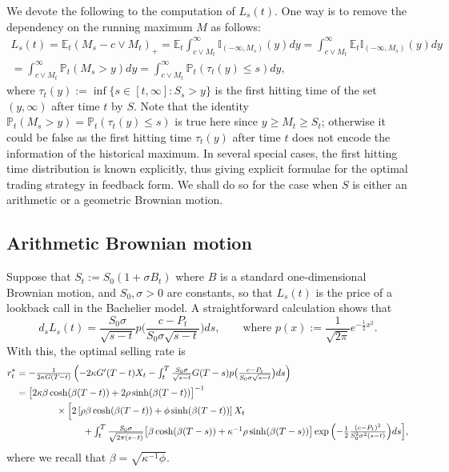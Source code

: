 \documentclass[openany,oneside]{article}
\theoremstyle{definition}
\theoremstyle{remark}
\newtheorem{rem}[thm]{Remark}
\newcommand{\E}{\mathbb{E}} %
\renewcommand{\P}{\mathbb{P}} %
\newcommand{\I}{\mathbb{I}} %
\newcommand{\ts}{\textstyle}
\begin{document}

We devote the following to the computation of $L_s(t)$. One way is to remove the dependency on the running maximum $M$ as follows:
\begin{multline*}
\ts L_s(t) = \E_t(M_s-c\vee M_t)_+ = \E_t \int_{c\vee M_t}^{\infty}\I_{(-\infty,M_s)}(y) dy = \int_{c\vee M_t}^\infty \E_t \I_{(-\infty,M_s)}(y)dy \\
 \ts = \int_{c\vee M_t}^\infty \P_t(M_s > y) dy= \int_{c\vee M_t}^\infty \P_t(\tau_t(y) \le s) dy,
\end{multline*}
where $\tau_t(y):=\inf\{s\in[t,\infty] : S_s> y\}$ is the first hitting time of the set $(y,\infty)$ after time $t$ by $S$. Note that the identity $\P_t(M_s > y) = \P_t(\tau_t(y)\le s)$ is true here since $y\ge M_t\ge S_t$; otherwise it could be false as the first hitting time $\tau_t(y)$ after time $t$ does not encode the information of the historical maximum. In several special cases, the first hitting time distribution is known explicitly, thus giving explicit formulae for the optimal trading strategy in feedback form. We shall do so for the case when $S$ is either an arithmetic or a geometric Brownian motion.

\subsection{Arithmetic Brownian motion}
Suppose that $S_t:=S_0(1+ \sigma B_t)$ where $B$ is a standard one-dimensional Brownian motion, and $S_0, \sigma>0$ are constants, so that $L_s(t)$ is the price of a lookback call in the Bachelier model. A straightforward calculation shows that
\[
 \ts d_s L_s(t) = \frac{S_0\sigma}{\sqrt{s-t}}p\bigl(\frac{c-P_t}{S_0\sigma\sqrt{s-t}}\bigr)ds,\qquad\text{where } p(x):=\frac{1}{\sqrt{2\pi}}e^{-\frac{1}{2}x^2}.
\]
With this, the optimal selling rate is
\begin{align*}
r^\ast_t &\ts= -\frac{1}{2\kappa G(T-t)}\left(-2\kappa G'(T-t) X_t - \int_t^T \frac{S_0\sigma}{\sqrt{s-t}} G(T-s) p\bigl(\frac{c-P_t}{S_0\sigma\sqrt{s-t}}\bigr) ds\right) \\
&= \bigl[2\kappa\beta\cosh(\beta (T-t))+2\rho\sinh(\beta (T-t))\bigr]^{-1} \\
&\hspace{1.5cm} \times \Bigl[2\left[\rho\beta\cosh(\beta (T-t))+\phi\sinh(\beta (T-t))\right] X_t\\
&\ts\hspace{2.5cm} + \int_t^T \frac{S_0\sigma}{\sqrt{2\pi(s-t)}}\bigl[\beta\cosh(\beta (T-s))+\kappa^{-1}\rho\sinh(\beta (T-s))\bigr] \exp{\left(-\frac{1}{2}\frac{(c-P_t)^2}{S_0^2\sigma^2(s-t)}\right)} ds \Bigr],
\end{align*}
where we recall that $\beta=\sqrt{\kappa^{-1}\phi}$.
\end{document}
